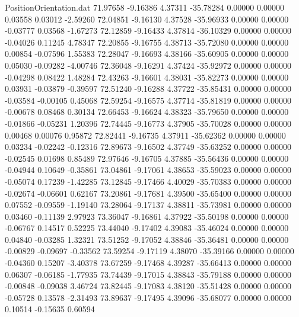 \begin{filecontents}{PositionOrientation.dat}
  71.97658   -9.16386    4.37311   -35.78284    0.00000    0.00000    0.03558    0.03012   -2.59260
  72.04851   -9.16130    4.37528   -35.96933    0.00000    0.00000   -0.03777    0.03568   -1.67273
  72.12859   -9.16433    4.37814   -36.10329    0.00000    0.00000   -0.04026    0.11245    4.78347
  72.20855   -9.16755    4.38713   -35.72080    0.00000    0.00000    0.00854   -0.07596    1.55383
  72.28047   -9.16693    4.38166   -35.60905    0.00000    0.00000    0.05030   -0.09282   -4.00746
  72.36048   -9.16291    4.37424   -35.92972    0.00000    0.00000   -0.04298    0.08422    1.48284
  72.43263   -9.16601    4.38031   -35.82273    0.00000    0.00000    0.03931   -0.03879   -0.39597
  72.51240   -9.16288    4.37722   -35.85431    0.00000    0.00000   -0.03584   -0.00105    0.45068
  72.59254   -9.16575    4.37714   -35.81819    0.00000    0.00000   -0.00678    0.08468    0.30134
  72.66453   -9.16624    4.38323   -35.79650    0.00000    0.00000   -0.01866   -0.05231    1.20396
  72.74445   -9.16773    4.37905   -35.70028    0.00000    0.00000    0.00468    0.00076    0.95872
  72.82441   -9.16735    4.37911   -35.62362    0.00000    0.00000    0.03234   -0.02242   -0.12316
  72.89673   -9.16502    4.37749   -35.63252    0.00000    0.00000   -0.02545    0.01698    0.85489
  72.97646   -9.16705    4.37885   -35.56436    0.00000    0.00000   -0.04944    0.10649   -0.35861
  73.04861   -9.17061    4.38653   -35.59023    0.00000    0.00000   -0.05074    0.17239   -1.42285
  73.12845   -9.17466    4.40029   -35.70383    0.00000    0.00000   -0.02674   -0.06601    0.62167
  73.20861   -9.17681    4.39500   -35.65400    0.00000    0.00000    0.07552   -0.09559   -1.19140
  73.28064   -9.17137    4.38811   -35.73981    0.00000    0.00000    0.03460   -0.11139    2.97923
  73.36047   -9.16861    4.37922   -35.50198    0.00000    0.00000   -0.06767    0.14517    0.52225
  73.44040   -9.17402    4.39083   -35.46024    0.00000    0.00000    0.04840   -0.03285    1.32321
  73.51252   -9.17052    4.38846   -35.36481    0.00000    0.00000   -0.00829   -0.09697   -0.33562
  73.59254   -9.17119    4.38070   -35.39166    0.00000    0.00000   -0.04360    0.15207   -3.40378
  73.67259   -9.17468    4.39287   -35.66413    0.00000    0.00000    0.06307   -0.06185   -1.77935
  73.74439   -9.17015    4.38843   -35.79188    0.00000    0.00000   -0.00848   -0.09038    3.46724
  73.82445   -9.17083    4.38120   -35.51428    0.00000    0.00000   -0.05728    0.13578   -2.31493
  73.89637   -9.17495    4.39096   -35.68077    0.00000    0.00000    0.10514   -0.15635    0.60594

\end{filecontents}
